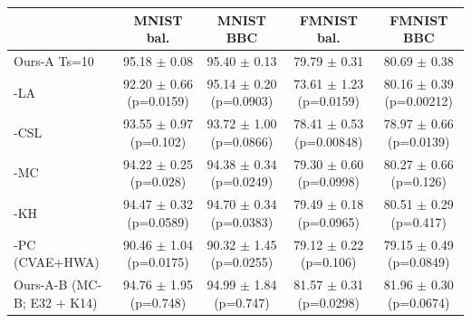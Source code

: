 \begin{tabular}{lcccc}
\toprule
 & MNIST bal. & MNIST BBC & FMNIST bal. & FMNIST BBC \\
\midrule
Ours-A Ts=10 & 95.18 $\pm$ 0.08 & 95.40 $\pm$ 0.13 & 79.79 $\pm$ 0.31 & 80.69 $\pm$ 0.38 \\
-LA & 92.20 $\pm$ 0.66 (p=0.0159) & 95.14 $\pm$ 0.20 (p=0.0903) & 73.61 $\pm$ 1.23 (p=0.0159) & 80.16 $\pm$ 0.39 (p=0.00212) \\
-CSL & 93.55 $\pm$ 0.97 (p=0.102) & 93.72 $\pm$ 1.00 (p=0.0866) & 78.41 $\pm$ 0.53 (p=0.00848) & 78.97 $\pm$ 0.66 (p=0.0139) \\
-MC & 94.22 $\pm$ 0.25 (p=0.028) & 94.38 $\pm$ 0.34 (p=0.0249) & 79.30 $\pm$ 0.60 (p=0.0998) & 80.27 $\pm$ 0.66 (p=0.126) \\
-KH & 94.47 $\pm$ 0.32 (p=0.0589) & 94.70 $\pm$ 0.34 (p=0.0383) & 79.49 $\pm$ 0.18 (p=0.0965) & 80.51 $\pm$ 0.29 (p=0.417) \\
-PC (CVAE+HWA) & 90.46 $\pm$ 1.04 (p=0.0175) & 90.32 $\pm$ 1.45 (p=0.0255) & 79.12 $\pm$ 0.22 (p=0.106) & 79.15 $\pm$ 0.49 (p=0.0849) \\
Ours-A-B (MC-B; E32 + K14) & 94.76 $\pm$ 1.95 (p=0.748) & 94.99 $\pm$ 1.84 (p=0.747) & 81.57 $\pm$ 0.31 (p=0.0298) & 81.96 $\pm$ 0.30 (p=0.0674) \\
\bottomrule
\end{tabular}
